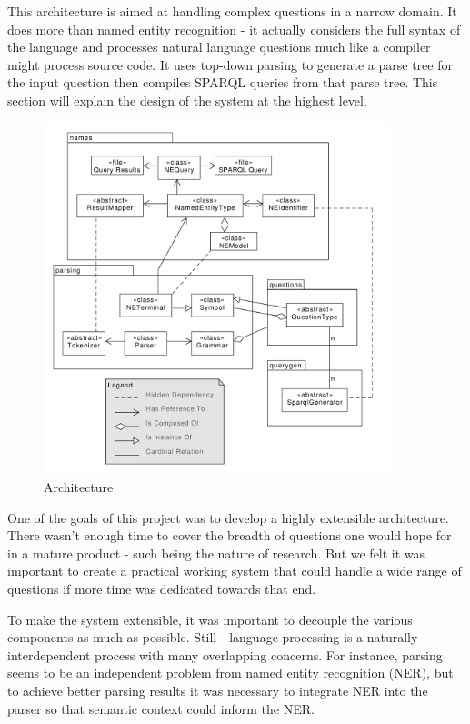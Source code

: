 \documentclass[11pt]{article}
\begin{document}
This architecture is aimed at handling complex questions in a narrow domain.
It does more than named entity recognition - it actually considers
the full syntax of the language and processes natural language questions
much like a compiler might process source code. It uses
top-down parsing to generate a parse tree for the input question then
compiles SPARQL queries from that parse tree.
This section will explain the design of the system at the highest level.

\begin{figure}[h!]
    \centering
    \includegraphics[width=0.9\textwidth,natwidth=1,natheight=1]{umlet/architecture.pdf}
    \caption{Architecture}
    \label{fig:arch}
\end{figure}


One of the goals of this project was to develop a
highly extensible architecture. There wasn't enough time to cover the
breadth of questions one would hope for in a mature product - such being
the nature of research. But we felt it was important to create a practical
working system that could handle a wide range of questions if more
time was dedicated towards that end.

To make the system extensible, it was important to decouple the various
components as much as possible. Still - language processing is a naturally
interdependent process with many overlapping concerns. For instance,
parsing seems to be an independent problem from named entity recognition (NER),
but to achieve better parsing results it was necessary to integrate NER into the
parser so that semantic context could inform the NER. 
\end{document}
